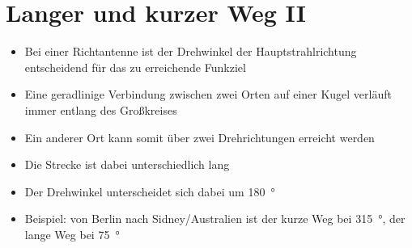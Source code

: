 
\section{Langer und kurzer Weg II}
\label{section:langer_kurzer_weg_2}
\begin{frame}%
\begin{itemize}
  \item Bei einer Richtantenne ist der Drehwinkel der Hauptstrahlrichtung entscheidend für das zu erreichende Funkziel
  \item Eine geradlinige Verbindung zwischen zwei Orten auf einer Kugel verläuft immer entlang des Großkreises
  \item Ein anderer Ort kann somit über zwei Drehrichtungen erreicht werden
  \item Die Strecke ist dabei unterschiedlich lang
  \item Der Drehwinkel unterscheidet sich dabei um \qty{180}{\degree}
  \item Beispiel: von Berlin nach Sidney/Australien ist der kurze Weg bei \qty{315}{\degree}, der lange Weg bei \qty{75}{\degree}
  \end{itemize}
\end{frame}

